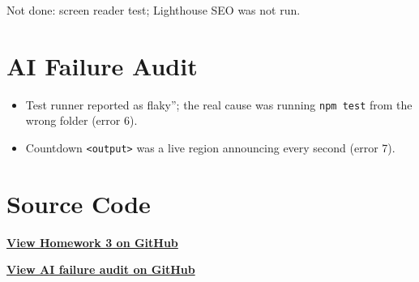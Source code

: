 Not done: screen reader test; Lighthouse SEO was not run.

\section{AI Failure Audit}

\begin{itemize}
    \item Test runner reported as flaky''; the real cause was running \texttt{npm test} from the wrong folder (error 6).
    \item Countdown \texttt{<output>} was a live region announcing every second (error 7).
\end{itemize}

\section{Source Code}

\begin{center}
    \href{https://github.com/Prosperum26/24520626_QuangPhuHung_MSIS207_Lab03/tree/main/src/homeworks/KraftonPubgVnArena}
    {\textbf{View Homework 3 on GitHub}}

    \href{https://github.com/Prosperum26/24520626_QuangPhuHung_MSIS207_Lab03/blob/main/AI_FAILURE_AUDIT.md}
    {\textbf{View AI failure audit on GitHub}}
\end{center}
